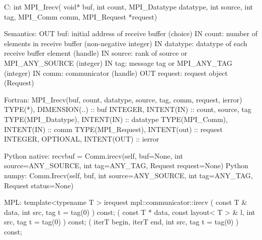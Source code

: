 C:
int MPI_Irecv(
  void* buf, int count, MPI_Datatype datatype,
  int source, int tag, MPI_Comm comm, MPI_Request *request)

Semantics:
OUT buf: initial address of receive buffer (choice)
IN count: number of elements in receive buffer (non-negative integer)
IN datatype: datatype of each receive buffer element (handle)
IN source: rank of source or MPI_ANY_SOURCE (integer)
IN tag: message tag or MPI_ANY_TAG (integer)
IN comm: communicator (handle)
OUT request: request object (Request)

Fortran:
MPI_Irecv(buf, count, datatype, source, tag, comm, request, ierror)
TYPE(*), DIMENSION(..) :: buf
INTEGER, INTENT(IN) :: count, source, tag
TYPE(MPI_Datatype), INTENT(IN) :: datatype
TYPE(MPI_Comm), INTENT(IN) :: comm
TYPE(MPI_Request), INTENT(out) :: request
INTEGER, OPTIONAL, INTENT(OUT) :: ierror

Python native:
recvbuf = Comm.irecv(self, buf=None, int source=ANY_SOURCE, int tag=ANY_TAG,
    Request request=None)
Python numpy:
Comm.Irecv(self, buf, int source=ANY_SOURCE, int tag=ANY_TAG,
    Request status=None)

MPL:
template<typename T >
irequest mpl::communicator::irecv
   ( const T & data, int src, tag t = tag(0) ) const;
   ( const T * data, const layout< T > &  l, int  src, tag  t = tag(0) ) const;
   ( iterT  begin, iterT  end, int  src, tag  t = tag(0) ) const;
